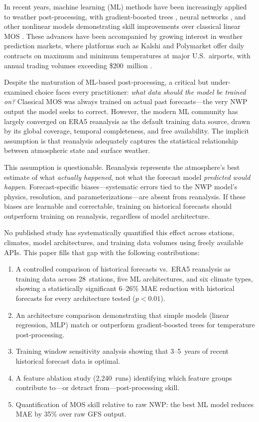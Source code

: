 \documentclass[12pt, letterpaper]{article}
\begin{document}
In recent years, machine learning (ML) methods have been increasingly applied to
weather post-processing, with gradient-boosted trees
\citep{taillardat2016calibrated}, neural networks \citep{rasp2018neural}, and other
nonlinear models demonstrating skill improvements over classical linear MOS
\citep{vannitsem2021statistical, schulz2022machine}. These advances have been
accompanied by growing interest in weather prediction markets, where platforms
such as Kalshi and Polymarket offer daily contracts on maximum and minimum
temperatures at major U.S.\ airports, with annual trading volumes exceeding
\$200~million \citep{snowberg2013prediction}.

Despite the maturation of ML-based post-processing, a critical but under-examined
choice faces every practitioner: \emph{what data should the model be trained on?}
Classical MOS was always trained on actual past forecasts---the very NWP output the
model seeks to correct. However, the modern ML community has largely converged on
ERA5 reanalysis \citep{hersbach2020era5} as the default training data source, drawn
by its global coverage, temporal completeness, and free availability. The implicit
assumption is that reanalysis adequately captures the statistical relationship
between atmospheric state and surface weather.

This assumption is questionable. Reanalysis represents the atmosphere's best
estimate of what \emph{actually happened}, not what the forecast model
\emph{predicted would happen}. Forecast-specific biases---systematic errors tied to
the NWP model's physics, resolution, and parameterizations---are absent from
reanalysis. If these biases are learnable and correctable, training on historical
forecasts should outperform training on reanalysis, regardless of model architecture.

No published study has systematically quantified this effect across stations,
climates, model architectures, and training data volumes using freely available
APIs. This paper fills that gap with the following contributions:

\begin{enumerate}
  \item A controlled comparison of historical forecasts vs.\ ERA5 reanalysis as
    training data across 28~stations, five ML architectures, and six climate types,
    showing a statistically significant 6--26\% MAE reduction with historical
    forecasts for every architecture tested ($p < 0.01$).
  \item An architecture comparison demonstrating that simple models (linear
    regression, MLP) match or outperform gradient-boosted trees for temperature
    post-processing.
  \item Training window sensitivity analysis showing that 3--5~years of recent
    historical forecast data is optimal.
  \item A feature ablation study (2{,}240~runs) identifying which feature groups
    contribute to---or detract from---post-processing skill.
  \item Quantification of MOS skill relative to raw NWP: the best ML model
    reduces MAE by 35\% over raw GFS output.
\end{enumerate}
\end{document}
